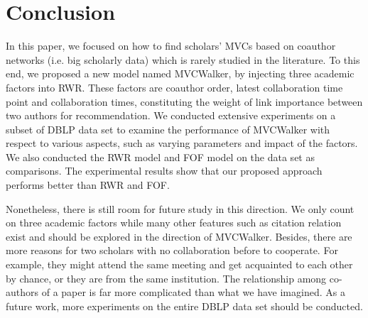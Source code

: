 \documentclass[10pt,journal,compsoc]{IEEEtran}
\begin{document}
\section{Conclusion}
In this paper, we focused on how to find scholars' MVCs based on coauthor networks (i.e. big scholarly data) which is rarely studied in the literature. To this end, we proposed a new model named MVCWalker, by injecting three academic factors into RWR. These factors are coauthor order, latest collaboration time point and collaboration times, constituting the weight of link importance between two authors for recommendation. We conducted extensive experiments on a subset of DBLP data set to examine the performance of MVCWalker with respect to various aspects, such as varying parameters and impact of the factors. We also conducted the RWR model and FOF model on the data set as comparisons. The experimental results show that our proposed approach performs better than RWR and FOF.

Nonetheless, there is still room for future study in this direction. We only count on three academic factors while many other features such as citation relation exist and should be explored in the direction of MVCWalker. Besides, there are more reasons for two scholars with no collaboration before to cooperate. For example, they might attend the same meeting and get acquainted to each other by chance, or they are from the same institution. The relationship among co-authors of a paper is far more complicated than what we have imagined. As a future work, more experiments on the entire DBLP data set should be conducted.

%


\ifCLASSOPTIONcaptionsoff
  \newpage
\fi



%
\end{document}

